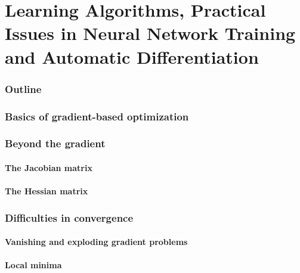 \renewcommand{\thispart}{4 }
\renewcommand{\thispartname}{
    Learning Algorithms, 
    Practical Issues in Neural Network Training 
    and Automatic Differentiation}

\part{\thispartname}

\section{Outline}






\section{Basics of gradient-based optimization}

\section{Beyond the gradient}
\subsection{The Jacobian matrix}

\subsection{The Hessian matrix}


\section{Difficulties in convergence}

\subsection{Vanishing and exploding gradient problems}

\subsection{Local minima}


